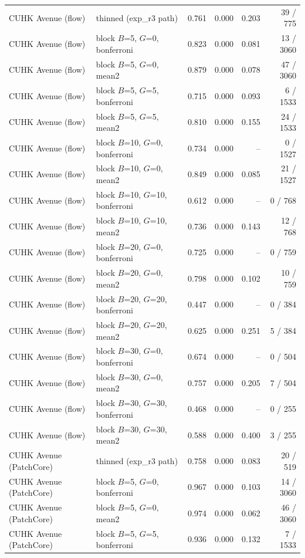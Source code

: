 \begin{table}[t]
{\begin{tabular}{llrrrr}
CUHK Avenue (flow) & thinned (exp_r3 path) & 0.761 & 0.000 & 0.203 & 39 / 775 \\
CUHK Avenue (flow) & block $B$=5, $G$=0, bonferroni & 0.823 & 0.000 & 0.081 & 13 / 3060 \\
CUHK Avenue (flow) & block $B$=5, $G$=0, mean2 & 0.879 & 0.000 & 0.078 & 47 / 3060 \\
CUHK Avenue (flow) & block $B$=5, $G$=5, bonferroni & 0.715 & 0.000 & 0.093 & 6 / 1533 \\
CUHK Avenue (flow) & block $B$=5, $G$=5, mean2 & 0.810 & 0.000 & 0.155 & 24 / 1533 \\
CUHK Avenue (flow) & block $B$=10, $G$=0, bonferroni & 0.734 & 0.000 & -- & 0 / 1527 \\
CUHK Avenue (flow) & block $B$=10, $G$=0, mean2 & 0.849 & 0.000 & 0.085 & 21 / 1527 \\
CUHK Avenue (flow) & block $B$=10, $G$=10, bonferroni & 0.612 & 0.000 & -- & 0 / 768 \\
CUHK Avenue (flow) & block $B$=10, $G$=10, mean2 & 0.736 & 0.000 & 0.143 & 12 / 768 \\
CUHK Avenue (flow) & block $B$=20, $G$=0, bonferroni & 0.725 & 0.000 & -- & 0 / 759 \\
CUHK Avenue (flow) & block $B$=20, $G$=0, mean2 & 0.798 & 0.000 & 0.102 & 10 / 759 \\
CUHK Avenue (flow) & block $B$=20, $G$=20, bonferroni & 0.447 & 0.000 & -- & 0 / 384 \\
CUHK Avenue (flow) & block $B$=20, $G$=20, mean2 & 0.625 & 0.000 & 0.251 & 5 / 384 \\
CUHK Avenue (flow) & block $B$=30, $G$=0, bonferroni & 0.674 & 0.000 & -- & 0 / 504 \\
CUHK Avenue (flow) & block $B$=30, $G$=0, mean2 & 0.757 & 0.000 & 0.205 & 7 / 504 \\
CUHK Avenue (flow) & block $B$=30, $G$=30, bonferroni & 0.468 & 0.000 & -- & 0 / 255 \\
CUHK Avenue (flow) & block $B$=30, $G$=30, mean2 & 0.588 & 0.000 & 0.400 & 3 / 255 \\
CUHK Avenue (PatchCore) & thinned (exp_r3 path) & 0.758 & 0.000 & 0.083 & 20 / 519 \\
CUHK Avenue (PatchCore) & block $B$=5, $G$=0, bonferroni & 0.967 & 0.000 & 0.103 & 14 / 3060 \\
CUHK Avenue (PatchCore) & block $B$=5, $G$=0, mean2 & 0.974 & 0.000 & 0.062 & 46 / 3060 \\
CUHK Avenue (PatchCore) & block $B$=5, $G$=5, bonferroni & 0.936 & 0.000 & 0.132 & 7 / 1533 \\

\end{tabular}}
\end{table}

